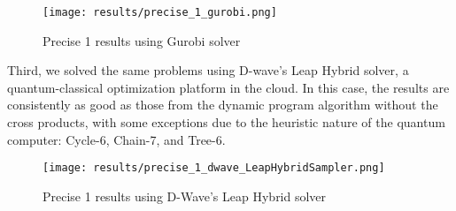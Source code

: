 \begin{figure*}[tbh]
    \centering
    \texttt{[image: results/precise\_1\_gurobi.png]}
    \caption{Precise 1 results using Gurobi solver}
    \label{fig:gurobi_precise_1}
\end{figure*}


Third, we solved the same problems using D-wave's Leap Hybrid solver, a quantum-classical optimization platform in the cloud. In this case, the results are consistently as good as those from the dynamic program algorithm without the cross products, with some exceptions due to the heuristic nature of the quantum computer: Cycle-6, Chain-7, and Tree-6.

\begin{figure*}[tbh]
    \centering
    \texttt{[image: results/precise\_1\_dwave\_LeapHybridSampler.png]}
    \caption{Precise 1 results using D-Wave's Leap Hybrid solver}
    \label{fig:leap_precise_1}
\end{figure*}


